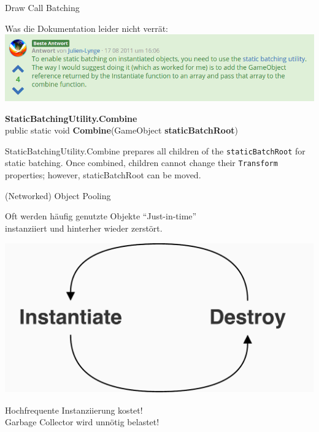 \documentclass{beamer}
\begin{document}
  \begin{frame}{Draw Call Batching}
	\begin{center}
		{\Large
		Was die Dokumentation leider nicht verrät:}\\
		\vspace{10pt}
		\includegraphics[width=\textwidth]{bilder/staticanswer.png}
	\end{center}
	
	{\Large \textbf{StaticBatchingUtility.Combine}}\\
	public static void \textbf{Combine}(GameObject \textbf{staticBatchRoot})\\
	
	\vspace{-15pt}
	
	StaticBatchingUtility.Combine prepares all children of the \texttt{staticBatchRoot} for static batching. Once combined, children cannot change their \texttt{Transform} properties; however, staticBatchRoot can be moved.
  \end{frame}

  
  \begin{frame}{(Networked) Object Pooling}
  	\begin{center}
  		Oft werden häufig genutzte Objekte ``Just-in-time''\\ instanziiert und hinterher wieder zerstört.
  	\end{center}
  	\begin{center}
  		\includegraphics[width=.6\textwidth]{bilder/instantiate.pdf}
  	\end{center}
  	\begin{center}
  		Hochfrequente Instanziierung kostet!\\Garbage Collector wird unnötig belastet!
  	\end{center}
  \end{frame}
  
\end{document}
